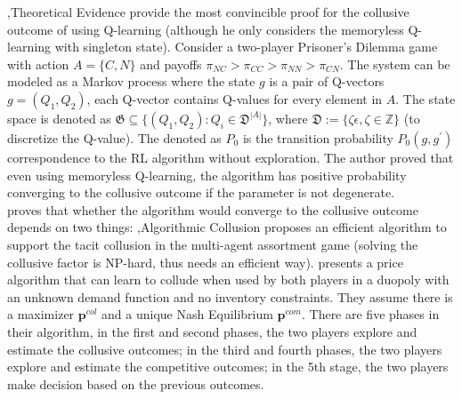 \documentclass[10pt]{report}
\begin{document}
\sep{Theoretical Evidence}
\cite{dolgopolov2024reinforcement} provide the most convincible proof for the collusive outcome of using Q-learning (although he only considers the memoryless Q-learning with singleton state). Consider a two-player Prisoner's Dilemma game with action $A=\{C,N\}$ and payoffs $\pi_{NC}>\pi_{CC}>\pi_{NN}>\pi_{CN}$. The system can be modeled as a Markov process where the state $g$ is a pair of Q-vectors $g=(Q_1,Q_2)$, each Q-vector contains Q-values for every element in $A$. The state space is denoted as $\mathfrak{G}\subseteq\{(Q_1,Q_2):Q_i\in\mathfrak{D}^{|A|}\}$, where $\mathfrak{D}:= \{\zeta\epsilon,\zeta\in\mathbb{Z}\}$ (to discretize the Q-value). The  denoted as $P_0$ is the transition probability $P_0(g,g^\prime)$ correspondence to the RL algorithm without exploration. The author proved that even using memoryless Q-learning, the algorithm has positive probability converging to the collusive outcome if the parameter is not degenerate. \\
\cite{possnig2023reinforcement} proves that whether the algorithm would converge to the collusive outcome depends on two things:
\sep{Algorithmic Collusion}
\cite{cho2024collusive} 
\cite{aouad2021algorithmic} proposes an efficient algorithm to support the tacit collusion in the multi-agent assortment game (solving the collusive factor is NP-hard, thus needs an efficient way). 
\cite{meylahn2022learning} presents a price algorithm that can learn to collude when used by both players in a duopoly with an unknown demand function and no inventory constraints. 
They assume there is a  maximizer $\mathbf{p}^{col}$ and a unique Nash Equilibrium $\mathbf{p}^{com}$. 
There are five phases in their algorithm, in the first and second phases, the two players explore and estimate the collusive outcomes; in the third and fourth phases, the two players explore and estimate the competitive outcomes; in the 5th stage, the two players make decision based on the previous outcomes. 
\end{document}
